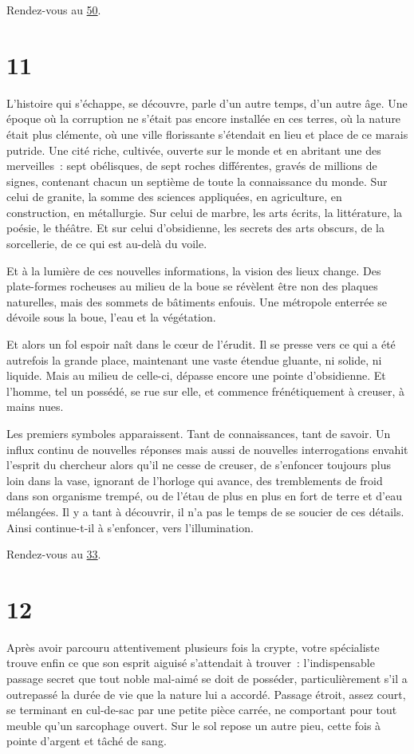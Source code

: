 \documentclass{report}
\newcommand{\gsection}[1]{
    \section{#1}
    \label{section-#1}
}
\newcommand{\glink}[1]{\hyperref[section-#1]{#1}}
\begin{document}
Rendez-vous au \glink{50}.

\gsection{11}

L'histoire qui s'échappe, se découvre, parle d'un autre temps, d'un autre âge. Une époque où la corruption ne s'était pas encore installée en ces terres, où la nature était plus clémente, où une ville florissante s'étendait en lieu et place de ce marais putride. Une cité riche, cultivée, ouverte sur le monde et en abritant une des merveilles : sept obélisques, de sept roches différentes, gravés de millions de signes, contenant chacun un septième de toute la connaissance du monde. Sur celui de granite, la somme des sciences appliquées, en agriculture, en construction, en métallurgie. Sur celui de marbre, les arts écrits, la littérature, la poésie, le théâtre. Et sur celui d'obsidienne, les secrets des arts obscurs, de la sorcellerie, de ce qui est au-delà du voile.

Et à la lumière de ces nouvelles informations, la vision des lieux change. Des plate-formes rocheuses au milieu de la boue se révèlent être non des plaques naturelles, mais des sommets de bâtiments enfouis. Une métropole enterrée se dévoile sous la boue, l'eau et la végétation.

Et alors un fol espoir naît dans le cœur de l'érudit. Il se presse vers ce qui a été autrefois la grande place, maintenant une vaste étendue gluante, ni solide, ni liquide. Mais au milieu de celle-ci, dépasse encore une pointe d'obsidienne. Et l'homme, tel un possédé, se rue sur elle, et commence frénétiquement à creuser, à mains nues.

Les premiers symboles apparaissent. Tant de connaissances, tant de savoir. Un influx continu de nouvelles réponses mais aussi de nouvelles interrogations envahit l'esprit du chercheur alors qu'il ne cesse de creuser, de s'enfoncer toujours plus loin dans la vase, ignorant de l'horloge qui avance, des tremblements de froid dans son organisme trempé, ou de l'étau de plus en plus en fort de terre et d'eau mélangées. Il y a tant à découvrir, il n'a pas le temps de se soucier de ces détails. Ainsi continue-t-il à s'enfoncer, vers l'illumination.

Rendez-vous au \glink{33}.

\gsection{12}

Après avoir parcouru attentivement plusieurs fois la crypte, votre spécialiste trouve enfin ce que son esprit aiguisé s'attendait à trouver : l'indispensable passage secret que tout noble mal-aimé se doit de posséder, particulièrement s'il a outrepassé la durée de vie que la nature lui a accordé. Passage étroit, assez court, se terminant en cul-de-sac par une petite pièce carrée, ne comportant pour tout meuble qu'un sarcophage ouvert. Sur le sol repose un autre pieu, cette fois à pointe d'argent et tâché de sang.
\end{document}
